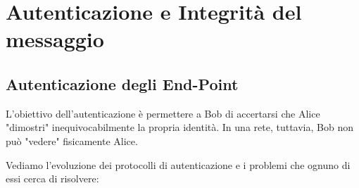 \documentclass[a4paper,12pt]{report}
\begin{document}
\newpage
\section{Autenticazione e Integrità del messaggio }

\subsection{Autenticazione degli End-Point}

\begin{notebox}{}
    L'obiettivo dell'autenticazione è permettere a Bob di accertarsi che Alice "dimostri" inequivocabilmente la propria identità. In una rete, tuttavia, Bob non può "vedere" fisicamente Alice. 
\end{notebox}


Vediamo l'evoluzione dei protocolli di autenticazione e i problemi che ognuno di essi cerca di risolvere:
\end{document}
